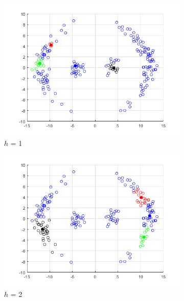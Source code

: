 \documentclass[12pt]{article}
\begin{document}
\begin{figure}[H]
    \centering %
\begin{subfigure}{0.25\textwidth}
  \includegraphics[width=\linewidth]{figs/1-b-meanshift-c-1.png}
  \caption{$h$ = 1}
  \label{fig:1}
\end{subfigure}\hfil %
\begin{subfigure}{0.25\textwidth}
  \includegraphics[width=\linewidth]{figs/1-b-meanshift-c-2.png}
  \caption{$h$ = 2}
  \label{fig:2}
\end{subfigure}\hfil %
\begin{subfigure}{0.25\textwidth}

\end{subfigure}
\end{figure}
\end{document}
